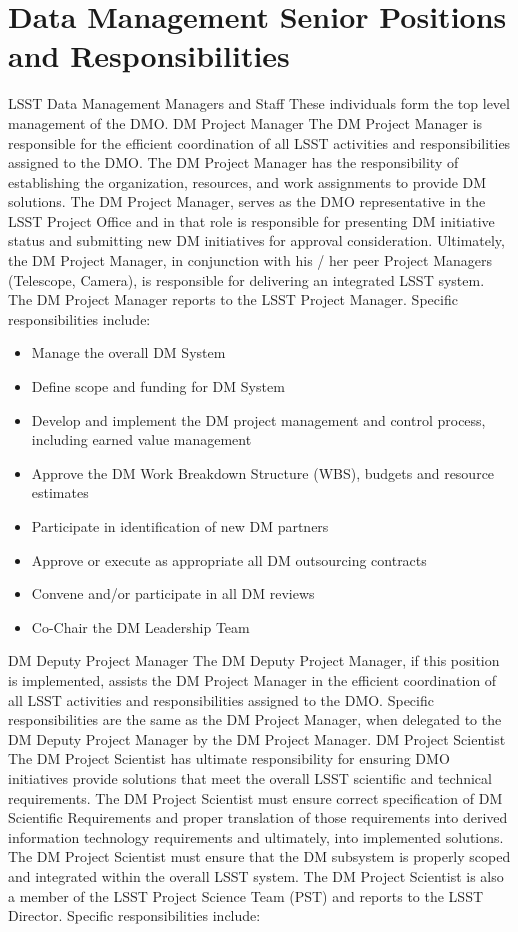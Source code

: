 \section{Data Management Senior Positions and Responsibilities}
LSST Data Management Managers and Staff
These individuals form the top level management of the DMO.
DM Project Manager
The DM Project Manager is responsible for the efficient coordination of all LSST activities and responsibilities assigned to the DMO. The DM Project Manager has the responsibility of establishing the organization, resources, and work assignments to provide DM solutions.  The DM Project Manager, serves as the DMO representative in the LSST Project Office and in that role is responsible for presenting DM initiative status and submitting new DM initiatives for approval consideration. Ultimately, the DM Project Manager, in conjunction with his / her peer Project Managers (Telescope, Camera), is responsible for delivering an integrated LSST system. The DM Project Manager reports to the LSST Project Manager. Specific responsibilities include:

\begin{itemize}
\item Manage the overall DM System
\item Define scope and funding for DM System 
\item Develop and implement the DM project management and control process, including earned value management
\item Approve the DM Work Breakdown Structure (WBS), budgets and resource estimates
\item Participate in identification of new DM partners 
\item Approve or execute as appropriate all DM outsourcing contracts 
\item Convene and/or participate in all DM reviews
\item Co-Chair the DM Leadership Team
\end{itemize}
DM Deputy Project Manager
The DM Deputy Project Manager, if this position is implemented, assists the DM Project Manager in the efficient coordination of all LSST activities and responsibilities assigned to the DMO.  Specific responsibilities are the same as the DM Project Manager, when delegated to the DM Deputy Project Manager by the DM Project Manager.
DM Project Scientist
The DM Project Scientist has ultimate responsibility for ensuring DMO initiatives provide solutions that meet the overall LSST scientific and technical requirements.  The DM Project Scientist must ensure correct specification of DM Scientific Requirements and proper translation of those requirements into derived information technology requirements and ultimately, into implemented solutions.  The DM Project Scientist must ensure that the DM subsystem is properly scoped and integrated within the overall LSST system.  The DM Project Scientist is also a member of the LSST Project Science Team (PST) and reports to the LSST Director. Specific responsibilities include:

